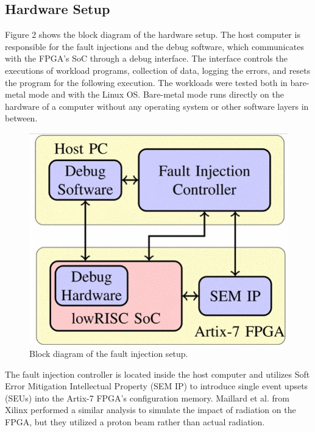 \documentclass[conference]{IEEEtran}
\begin{document}
\subsection{Hardware Setup}
Figure 2 shows the block diagram of the hardware setup. 
The host computer is responsible for the fault injections and the debug software, which communicates with the FPGA's SoC
through a debug interface. The interface controls the executions of workload programs, collection of data, logging the errors,
and resets the program for the following execution. The workloads were tested both in bare-metal mode and with the Linux OS. 
Bare-metal mode runs directly on the hardware of a computer without any operating system or other software layers in between. 
\begin{figure}[h]
    \centering
    \includegraphics[scale = 0.5]{fault_inject.jpg}
    \caption{Block diagram of the fault injection setup.}
\end{figure}

The fault injection controller is located inside the host computer and utilizes Soft Error Mitigation Intellectual Property (SEM IP)
to introduce single event upsets (SEUs) into the Artix-7 FPGA's configuration memory. Maillard et al. from Xilinx performed 
a similar analysis\cite{b3} to simulate the impact of radiation on the FPGA, but they utilized a proton beam rather than actual radiation.
\end{document}
